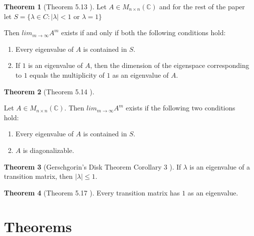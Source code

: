 \documentclass{amsart}
\theoremstyle{definition}
\newtheorem{theorem}{Theorem}
\theoremstyle{remark}
\numberwithin{equation}{section}
\begin{document}
\begin{theorem}[Theorem 5.13 \cite{friedberg2003linear}]\label{theorem513}
Let $A \in M_{n \times n}(\mathbb{C})$ and for the rest of the paper let $S = \{ \lambda \in C: |\lambda| < 1$ or $\lambda = 1\}$

Then $lim_{m \to \infty}A^m$ exists if and only if both the following conditions hold:

\begin{enumerate}
	\item Every eigenvalue of $A$ is contained in $S$.
	\item If $1$ is an eigenvalue of $A$, then the dimension of the eigenspace corresponding to $1$ equals the multiplicity of $1$ as an eigenvalue of $A$.

\end{enumerate}

\end{theorem}

\begin{theorem}[Theorem 5.14 \cite{friedberg2003linear}]\label{theorem514}

Let $A \in M_{n \times n}(\mathbb{C})$.
Then $lim_{m \to \infty}A^m$ exists if the following two conditions hold:

\begin{enumerate}
	\item Every eigenvalue of $A$ is contained in $S$.
	\item $A$ is diagonalizable.

\end{enumerate}

\end{theorem}


\begin{theorem}[Gerschgorin's Disk Theorem Corollary 3 \cite{friedberg2003linear}]\label{theorem516}
If $\lambda$ is an eigenvalue of a transition matrix, then $|\lambda| \leq 1$.

\end{theorem}

\begin{theorem}[Theorem 5.17 \cite{friedberg2003linear}]\label{theorem517}
Every transition matrix has $1$ as an eigenvalue.

\end{theorem}


\section{Theorems}
\end{document}
